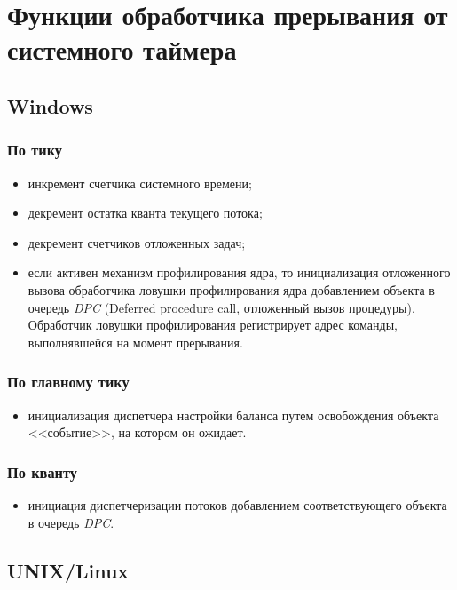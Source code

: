 \chapter{Функции обработчика прерывания от системного таймера}

\section{Windows}

\subsection*{По тику}
\begin{itemize}
	\item инкремент счетчика системного времени;
	\item декремент остатка кванта текущего потока;
	\item декремент счетчиков отложенных задач;
	\item если активен механизм профилирования ядра, то инициализация отложенного вызова обработчика ловушки профилирования ядра добавлением объекта в очередь \textit{DPC} (Deferred procedure call, отложенный вызов процедуры). Обработчик ловушки профилирования регистрирует адрес команды, выполнявшейся на момент прерывания. 
\end{itemize}

\subsection*{По главному тику}
\begin{itemize}
	\item инициализация диспетчера настройки баланса путем освобождения объекта <<событие>>, на котором он ожидает.
\end{itemize}

\subsection*{По кванту}
\begin{itemize}
	\item инициация диспетчеризации потоков добавлением соответствующего объекта в очередь \textit{DPC}.
\end{itemize}

\section{UNIX/Linux}

